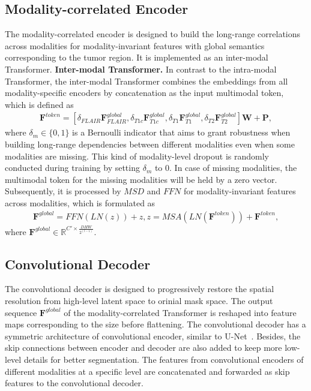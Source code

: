 \documentclass[runningheads]{llncs}
\begin{document}
\subsection{Modality-correlated Encoder}
The modality-correlated encoder is designed to build the long-range correlations across modalities for modality-invariant features with global semantics corresponding to the tumor region. It is implemented as an inter-modal Transformer. 
\noindent\textbf{Inter-modal Transformer.} In contrast to the intra-modal Transformer, the inter-modal Transformer combines the embeddings from all modality-specific encoders by concatenation as the input multimodal token, which is defined as
\begin{equation}
	\begin{aligned}
	    \mathbf{F}^{token} = [\delta_{FLAIR}\mathbf{F}^{global}_{FLAIR}, \delta_{T1c}\mathbf{F}^{global}_{T1c}, \delta_{T1}\mathbf{F}^{global}_{T1}, \delta_{T2}\mathbf{F}^{global}_{T2}]\mathbf{W} + \mathbf{P},
	\end{aligned}
\end{equation}
where $\delta_m \in \{0, 1\}$ is a Bernoulli indicator that aims to grant robustness when building long-range dependencies between different modalities even when some modalities are missing. This kind of modality-level dropout is randomly conducted during training by setting $\delta_m$ to 0. In case of missing modalities, the multimodal token for the missing modalities will be held by a zero vector.
Subsequently, it is processed by $MSD$ and $FFN$ for modality-invariant features across modalities, which is formulated as
\begin{equation}
	\begin{aligned}
	    \mathbf{F}^{global} = FFN(LN(z)) + z, z = MSA(LN(\mathbf{F}^{token})) + \mathbf{F}^{token},
	\end{aligned}
\end{equation}
where $\mathbf{F}^{global} \in \mathbb{R}^{C' \times \frac{DHW}{2^{(l-1)}}}$.

\subsection{Convolutional Decoder}
The convolutional decoder is designed to progressively restore the spatial resolution from high-level latent space to orinial mask space. The output sequence $\mathbf{F}^{global}$ of the modality-correlated Transformer is reshaped into feature maps corresponding to the size before flattening. The convolutional decoder has a symmetric architecture of convolutional encoder, similar to U-Net~\cite{ronneberger2015u}. Besides, the skip connections between encoder and decoder are also added to keep more low-level details for better segmentation. The features from convolutional encoders of different modalities at a specific level are concatenated and forwarded as skip features to the convolutional decoder.
\end{document}
